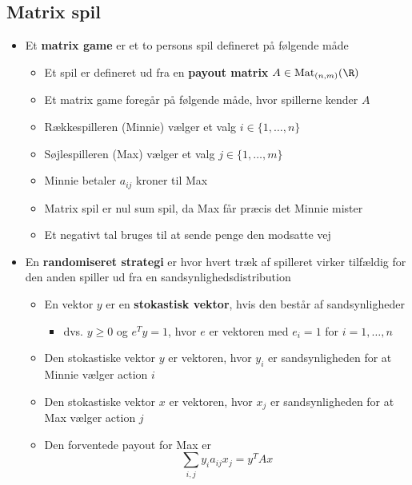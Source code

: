 \subsection{Matrix spil}
\begin{itemize}
	\item Et \textbf{matrix game} er et to persons spil defineret på følgende måde
  \begin{itemize}
    \item Et spil er defineret ud fra en \textbf{payout matrix} $A \in \text{Mat}_{(n,m)}(\R)$
    \item Et matrix game foregår på følgende måde, hvor spillerne kender $A$ 
    \item Rækkespilleren (Minnie) vælger et valg $i \in \{1,\dots,n\}$  
    \item Søjlespilleren (Max) vælger et valg $j \in \{1,\dots,m\}$  
    \item Minnie betaler $a_{ij}$ kroner til Max
    \item Matrix spil er nul sum spil, da Max får præcis det Minnie mister
    \item Et negativt tal bruges til at sende penge den modsatte vej
  \end{itemize}
  \item En \textbf{randomiseret strategi} er hvor hvert træk af spilleret virker tilfældig for den anden spiller ud fra en sandsynlighedsdistribution
  \begin{itemize}
    \item En vektor $y$ er en \textbf{stokastisk vektor}, hvis den består af sandsynligheder 
    \begin{itemize}
    	\item dvs. $y \geq 0$ og $e^Ty = 1$, hvor $e$ er vektoren med $e_i = 1$ for $i=1,\dots,n$    
    \end{itemize}
    \item Den stokastiske vektor $y$ er vektoren, hvor $y_i$ er sandsynligheden for at Minnie vælger action $i$ 
  	\item Den stokastiske vektor $x$ er vektoren, hvor $x_j$ er sandsynligheden for at Max vælger action $j$ 
    \item Den forventede payout for Max er 
    \begin{equation*}
      \sum_{i,j} y_ia_{ij}x_j = y^T A x
    \end{equation*}
  \end{itemize}
\end{itemize}

